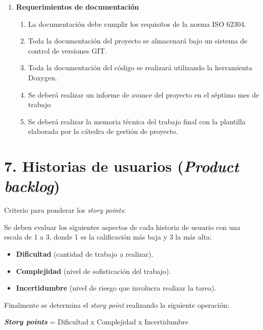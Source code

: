 \documentclass[
11pt, %
codirector, %
]{charter}
\begin{document}
\begin{enumerate}
\begin{enumerate}
		\end{enumerate}
	\item \textbf{Requerimientos de documentación}
		\begin{enumerate}
			\item La documentación debe cumplir los requisitos de la norma ISO 62304.
			\item Toda la documentación del proyecto se almacenará bajo un sistema de control de versiones GIT.
			\item Toda la documentación del código se realizará utilizando la herramienta Doxygen.
			\item Se deberá realizar un informe de avance del proyecto en el séptimo mes de trabajo
			\item Se deberá realizar la memoria técnica del trabajo final con la plantilla elaborada por la cátedra de gestión de proyecto.
		\end{enumerate}
			
\end{enumerate}

\section{7. Historias de usuarios (\textit{Product backlog})}
\label{sec:backlog}

Criterio para ponderar los \textit{story points}: 

Se deben evaluar los siguientes aspectos de cada historia de usuario con una escala de 1 a 3, donde 1 es la calificación más baja y 3 la más alta:
\begin{itemize}
	\item \textbf{Dificultad} (cantidad de trabajo a realizar).
	\item \textbf{Complejidad} (nivel de sofisticación del trabajo).
	\item \textbf{Incertidumbre} (nivel de riesgo que involucra realizar la tarea).
\end{itemize}	

Finalmente se determina el \textit{story point} realizando la siguiente operación:

\textbf{\textit{Story points}} = Dificultad x Complejidad x Incertidumbre
\end{document}
